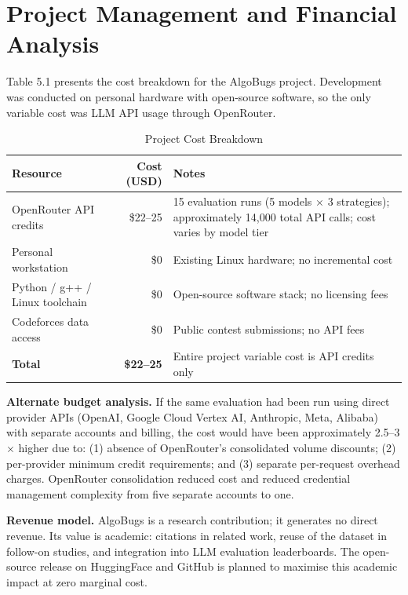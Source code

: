 \section{Project Management and Financial Analysis}

Table 5.1 presents the cost breakdown for the AlgoBugs project. Development was conducted on personal hardware with open-source software, so the only variable cost was LLM API usage through OpenRouter.

\begin{table}[h!]
    \centering
    \caption{Project Cost Breakdown}
    \label{tab:cost}
    {\setlength{\tabcolsep}{8pt}%
    \begin{tabularx}{\linewidth}{lrX}
        \toprule
        \textbf{Resource} & \textbf{Cost (USD)} & \textbf{Notes} \\
        \midrule
        \rowcolor{gray!10}
        OpenRouter API credits & \$22--25 & 15 evaluation runs (5 models $\times$ 3 strategies); approximately 14,000 total API calls; cost varies by model tier \\
        Personal workstation & \$0 & Existing Linux hardware; no incremental cost \\
        \rowcolor{gray!10}
        Python / g++ / Linux toolchain & \$0 & Open-source software stack; no licensing fees \\
        Codeforces data access & \$0 & Public contest submissions; no API fees \\
        \midrule
        \textbf{Total} & \textbf{\$22--25} & Entire project variable cost is API credits only \\
        \bottomrule
    \end{tabularx}}
\end{table}

\textbf{Alternate budget analysis.} If the same evaluation had been run using direct provider APIs (OpenAI, Google Cloud Vertex AI, Anthropic, Meta, Alibaba) with separate accounts and billing, the cost would have been approximately 2.5--3$\times$ higher due to: (1) absence of OpenRouter's consolidated volume discounts; (2) per-provider minimum credit requirements; and (3) separate per-request overhead charges. OpenRouter consolidation reduced cost and reduced credential management complexity from five separate accounts to one.

\textbf{Revenue model.} AlgoBugs is a research contribution; it generates no direct revenue. Its value is academic: citations in related work, reuse of the dataset in follow-on studies, and integration into LLM evaluation leaderboards. The open-source release on HuggingFace and GitHub is planned to maximise this academic impact at zero marginal cost.

